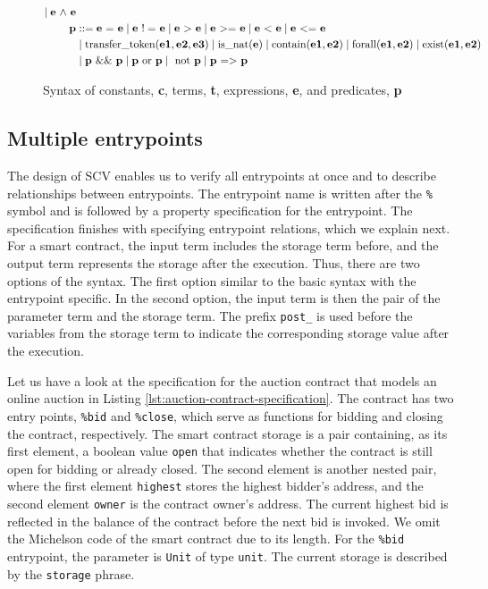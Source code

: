 \documentclass[runningheads]{llncs}
\begin{document}
\begin{figure}[tp]
\begin{align*}
\mid \textbf{e} \text{ $\wedge$ } \textbf{e}  \\
\textbf{p} & :: = \textbf{e} \text{ = } \textbf{e}
\mid \textbf{e} \text{ $!=$ } \textbf{e}
\mid \textbf{e} \text{ $>$ } \textbf{e}
\mid \textbf{e} \text{ $>=$ } \textbf{e}
\mid \textbf{e} \text{ $<$ } \textbf{e}
\mid \textbf{e} \text{ $<=$ } \textbf{e} \\
& \mid \text{transfer\_token} (\textbf{e1}, \textbf{e2}, \textbf{e3})  
 \mid \text{is\_nat} (\textbf{e})  
 \mid \text{contain} (\textbf{e1}, \textbf{e2}) 
 \mid \text{forall} (\textbf{e1}, \textbf{e2})
\mid \text{exist} (\textbf{e1}, \textbf{e2}) \\
& \mid \textbf{p} \text{ \&\& } \textbf{p}\mid \textbf{p} \text{ or } \textbf{p}  
\mid  \text{ not } \textbf{p} \mid \textbf{p} \text{ $=>$ } \textbf{p} \\
\end{align*}
\caption{Syntax of constants, \textbf{c}, terms, \textbf{t}, expressions, \textbf{e}, and predicates, \textbf{p}}
\label{fig:syntax-terms-predicates}
\end{figure}
\subsection{Multiple entrypoints}
\label{sec:multiple-entrypoint}
The design of SCV enables us to verify all entrypoints
at once and to describe relationships between entrypoints. The entrypoint name is written after the \lstinline/%/ symbol and is followed by a property specification for the entrypoint.  The specification finishes with specifying entrypoint relations, which we explain next. For a smart contract, the input term includes the storage term before, and the output term represents the storage after the execution. Thus, there are two options of the syntax. The first option similar to the basic syntax with the entrypoint specific.  
In the second option, the input term is then the pair of the parameter term and the storage term. The prefix \lstinline/post_/ is used before the variables from the storage term to indicate the corresponding storage value after the execution.

Let us have a look at the specification for the auction
contract that models an online auction in Listing \ref{lst:auction-contract-specification}. The contract has two entry points, \lstinline|%bid| and \lstinline|%close|, which serve as functions for bidding and closing the contract, respectively. The smart contract storage is a pair containing, as its first element, a boolean value \lstinline|open| that indicates whether the contract is still open for bidding or already closed. The second element is another nested pair, where the first element \lstinline|highest| stores the highest bidder's address, and the second element \lstinline|owner| is the contract owner's address. The current highest bid is reflected in the balance of the contract before the next bid is invoked. We omit the Michelson code of the smart contract due to its length.  For the \lstinline/%bid/ entrypoint, the parameter is \lstinline/Unit/ of type \lstinline/unit/.
The current storage is described by the \lstinline|storage| phrase. 
\end{document}
